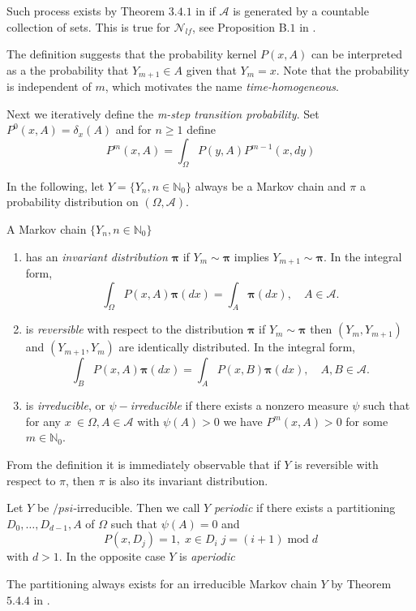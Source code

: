 Such process exists by Theorem $3.4.1$ in \cite{MeynTweedie1993} if $\mathcal A$ is generated by a countable collection of sets. This is true for $\mathcal N_{lf}$, see Proposition B$.1$ in \cite{MollerWaagepetersen2003}. \newline

The definition suggests that the probability kernel $P(x,A)$ can be interpreted as a the probability that $Y_{m+1} \in A$ given that $Y_{m}=x$. Note that the probability is independent of $m$, which motivates the name \textit{time-homogeneous}.

Next we iteratively define the \textit{m-step transition probability}. Set $P^0(x,A) = \delta_x(A)$ and for $n\geq 1$ define
$$P^m(x,A) = \int_\Omega P(y,A) P^{m-1} (x,dy)$$


In the following, let $Y=\{Y_n, n\in \mathbb N_0\}$ always be a Markov chain and $\pi$ a probability distribution on $(\Omega,\mathcal A)$.

\begin{definition}
A Markov chain $\{Y_n, n \in \mathbb N_0\}$ 
\begin{enumerate}
\item has an \textit{invariant distribution} $\mathbf \pi$ if $Y_m \sim \mathbf\pi$ implies $Y_{m+1}\sim \mathbf\pi$. In the integral form,
$$\int_\Omega P(x,A) \mathbf\pi(dx) = \int_A \mathbf\pi(dx), \quad A \in \mathcal A.$$
\item is \textit{reversible} with respect to the distribution $\mathbf \pi$ if $Y_m \sim \mathbf\pi$ then $(Y_m,Y_{m+1})$ and $(Y_{m+1},Y_m)$ are identically distributed. In the integral form,
$$\int_B P(x,A) \mathbf\pi(dx) = \int_A P(x,B) \mathbf\pi(dx), \quad A,B\in\mathcal A .$$
\item is \textit{irreducible}, or $\psi-$\textit{irreducible} if there exists a nonzero measure $\psi$ such that for any $x~\in \Omega, A\in\mathcal A$ with $\psi(A)>0$ we have $P^m(x,A)>0$ for some $m\in\mathbb N_0$.
\end{enumerate}
\end{definition}
From the definition it is immediately observable that if $Y$ is reversible with respect to $\pi$, then $\pi$ is also its invariant distribution.


\begin{definition} Let $Y$ be $/psi$-irreducible. Then we call $Y$ \textit{periodic} if there exists a partitioning $D_0,\dots,D_{d-1},A$ of $\Omega$ such that $\psi(A)=0$ and 
$$P(x,D_{j}) = 1, \; x\in D_i\; j=(i+1)\; \mathrm{mod} \;d$$
with $d>1$. In the opposite case $Y$ is \textit{aperiodic}
\end{definition}
The partitioning always exists for an irreducible Markov chain $Y$ by Theorem $5.4.4$ in \cite{MeynTweedie1993}.




